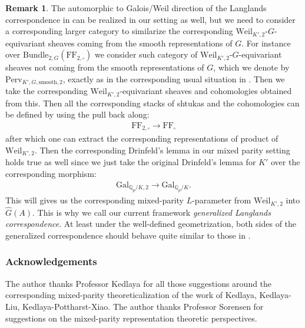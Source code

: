 \documentclass[12pt]{book}
\theoremstyle{definition}
\newtheorem{remark}{Remark}
\begin{document}
\begin{remark}
The automorphic to Galois/Weil direction of the Langlands correspondence in \cite{LPFS} can be realized in our setting as well, but we need to consider a corresponding larger category to similarize the corresponding $\mathrm{Weil}_{K',2}$-$G$-equivariant sheaves coming from the smooth representations of $G$. For instance over $\mathrm{Bundle}_{2,G}(\mathrm{FF}_{2,\square})$ we consider such category of $\mathrm{Weil}_{K',2}$-$G$-equivariant sheaves not coming from the smooth representations of $G$, which we denote by $\mathrm{Perv}_{K',G,\mathrm{smooth},2}$, exactly as in the corresponding usual situation in \cite{LPFS}. Then we take the corresponding $\mathrm{Weil}_{K',2}$-equivariant sheaves and cohomologies obtained from this. Then all the corresponding stacks of shtukas and the cohomologies can be defined by using the pull back along:
\begin{align}
\mathrm{FF}_{2,\square} \rightarrow \mathrm{FF}_{\square}
\end{align}
after which one can extract the corresponding representations of product of $\mathrm{Weil}_{K',2}$. Then the corresponding Drinfeld's lemma in our mixed parity setting holds true as well since we just take the original Drinfeld's lemma for $K'$ over the corresponding morphism:
\begin{align}
\mathrm{Gal}_{\mathbb{Q}_p/K,2} \rightarrow \mathrm{Gal}_{\mathbb{Q}_p/K}.
\end{align}
This will gives us the corresponding mixed-parity $L$-parameter from $\mathrm{Weil}_{K',2}$ into $\widehat{G}(A)$. This is why we call our current framework \textit{generalized Langlands correspondence}. At least under the well-defined geometrization, both sides of the generalized correspondence should behave quite similar to those in \cite{LPFS}.

\end{remark}









\newpage
\subsubsection*{Acknowledgements}
The author thanks Professor Kedlaya for all those suggestions around the corresponding mixed-parity theoreticalization of the work of Kedlaya, Kedlaya-Liu, Kedlaya-Pottharst-Xiao. The author thanks Professor Sorensen for suggestions on the mixed-parity representation theoretic perspectives.
\end{document}
